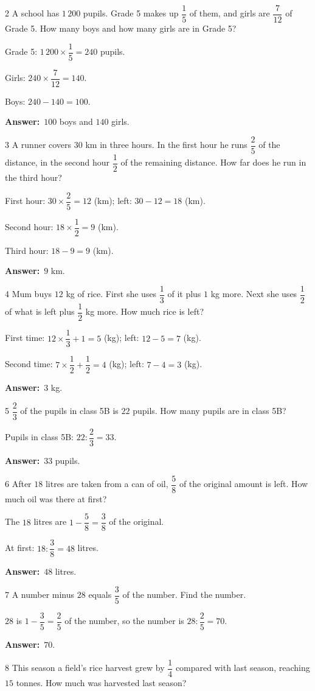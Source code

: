 \documentclass[11pt]{article}
\newif\ifsol \solfalse
\providecommand{\AnsWord}{Đáp số}
\newcommand{\dapso}[1]{\par\textbf{\AnsWord:}\ #1}
\newcommand{\probsol}[1]{%
  \begin{lrbox}{\solmeasure}\begin{minipage}{\dimexpr\linewidth-24pt\relax}#1\end{minipage}\end{lrbox}%
  \ifsol
    \begin{solbox}#1\end{solbox}%
  \else
    \setlength{\solht}{\dimexpr\ht\solmeasure+\dp\solmeasure+0.85cm\relax}%
    \ifdim\solht<1.35cm\setlength{\solht}{1.35cm}\fi
    \begin{tcolorbox}[colback=white,colframe=Line,boxrule=0.8pt,arc=5pt,
      left=8pt,right=8pt,top=4pt,bottom=4pt,height=\solht]{\footnotesize\color{Slate}\itshape\WorkWord}\end{tcolorbox}%
  \fi}
\newcommand{\gap}{\vspace{0.3cm}}
\def\WorkWord{Your work:}
\def\AnsWord{Answer}
\begin{document}
\gap
\begin{probbox}{2}{\relax}
A school has $1\,200$ pupils. Grade 5 makes up $\dfrac15$ of them, and girls are $\dfrac7{12}$ of Grade 5. How many boys and how many girls are in Grade 5?
\end{probbox}
\probsol{
Grade 5: $1\,200\times\dfrac15=240$ pupils.\par Girls: $240\times\dfrac7{12}=140$.\par Boys: $240-140=100$.
\dapso{$100$ boys and $140$ girls.}}
\gap
\begin{probbox}{3}{\relax}
A runner covers $30$ km in three hours. In the first hour he runs $\dfrac25$ of the distance, in the second hour $\dfrac12$ of the remaining distance. How far does he run in the third hour?
\end{probbox}
\probsol{
First hour: $30\times\dfrac25=12$ (km); left: $30-12=18$ (km).\par
Second hour: $18\times\dfrac12=9$ (km).\par Third hour: $18-9=9$ (km).
\dapso{$9$ km.}}
\gap
\begin{probbox}{4}{\relax}
Mum buys $12$ kg of rice. First she uses $\dfrac13$ of it plus $1$ kg more. Next she uses $\dfrac12$ of what is left plus $\dfrac12$ kg more. How much rice is left?
\end{probbox}
\probsol{
First time: $12\times\dfrac13+1=5$ (kg); left: $12-5=7$ (kg).\par
Second time: $7\times\dfrac12+\dfrac12=4$ (kg); left: $7-4=3$ (kg).
\dapso{$3$ kg.}}
\gap
\begin{probbox}{5}{\relax}
$\dfrac23$ of the pupils in class 5B is $22$ pupils. How many pupils are in class 5B?
\end{probbox}
\probsol{
Pupils in class 5B: $22:\dfrac23=33$.
\dapso{$33$ pupils.}}
\gap
\begin{probbox}{6}{\relax}
After $18$ litres are taken from a can of oil, $\dfrac58$ of the original amount is left. How much oil was there at first?
\end{probbox}
\probsol{
The $18$ litres are $1-\dfrac58=\dfrac38$ of the original.\par At first: $18:\dfrac38=48$ litres.
\dapso{$48$ litres.}}
\gap
\begin{probbox}{7}{\relax}
A number minus $28$ equals $\dfrac35$ of the number. Find the number.
\end{probbox}
\probsol{
$28$ is $1-\dfrac35=\dfrac25$ of the number, so the number is $28:\dfrac25=70$.
\dapso{$70$.}}
\gap
\begin{probbox}{8}{\relax}
This season a field's rice harvest grew by $\dfrac14$ compared with last season, reaching $15$ tonnes. How much was harvested last season?
\end{probbox}
\end{document}
